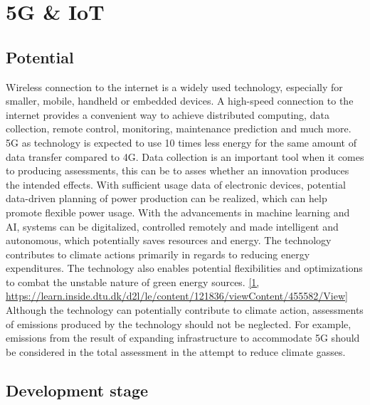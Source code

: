 \section*{5G \& IoT}
\subsection*{Potential}
Wireless connection to the internet is a widely used technology, especially for smaller, mobile, handheld or embedded devices. 
A high-speed connection to the internet provides a convenient way to achieve distributed computing, data collection, remote control, monitoring, maintenance prediction and much more.
5G as technology is expected to use 10 times less energy for the same amount of data transfer compared to 4G. 
Data collection is an important tool when it comes to producing assessments, this can be to asses whether an innovation produces the intended effects. 
With sufficient usage data of electronic devices, potential data-driven planning of power production can be realized, which can help promote flexible power usage.
With the advancements in machine learning and AI, systems can be digitalized, controlled remotely and made intelligent and autonomous, which potentially saves resources and energy.
The technology contributes to climate actions primarily in regards to reducing energy expenditures. 
The technology also enables potential flexibilities and optimizations to combat the unstable nature of green energy sources. \href{https://learn.inside.dtu.dk/d2l/le/content/121836/viewContent/455582/View}{[1, https://learn.inside.dtu.dk/d2l/le/content/121836/viewContent/455582/View]}
Although the technology can potentially contribute to climate action, assessments of emissions produced by the technology should not be neglected.
For example, emissions from the result of expanding infrastructure to accommodate 5G should be considered in the total assessment in the attempt to reduce climate gasses. 

\subsection*{Development stage}

